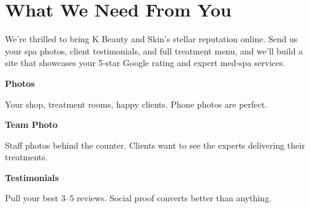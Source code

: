 \documentclass[11pt,letterpaper]{article}
\begin{document}
\vspace{0.2em}

\section*{What We Need From You}

We’re thrilled to bring K Beauty and Skin’s stellar reputation online. Send us your spa photos, client testimonials, and full treatment menu, and we’ll build a site that showcases your 5‑star Google rating and expert med‑spa services.

\vspace{0.12em}

\noindent\begin{minipage}[t]{0.48\textwidth}
\begin{tcolorbox}[colframe=accent-teal, boxrule=1pt, left=0.7em, right=0.7em, top=0.5em, bottom=0.5em, arc=4pt, boxsep=0pt]
{\bfseries\small\color{accent-teal}Photos}

\vspace{0.15em}

{\small Your shop, treatment rooms, happy clients. Phone photos are perfect.}
\end{tcolorbox}

\vspace{0.1em}

\begin{tcolorbox}[colframe=accent-teal, boxrule=1pt, left=0.7em, right=0.7em, top=0.5em, bottom=0.5em, arc=4pt, boxsep=0pt]
{\bfseries\small\color{accent-teal}Team Photo}

\vspace{0.15em}

{\small Staff photos behind the counter. Clients want to see the experts delivering their treatments.}
\end{tcolorbox}

\vspace{0.1em}

\begin{tcolorbox}[colframe=accent-teal, boxrule=1pt, left=0.7em, right=0.7em, top=0.5em, bottom=0.5em, arc=4pt, boxsep=0pt]
{\bfseries\small\color{accent-teal}Testimonials}

\vspace{0.15em}

{\small Pull your best 3--5 reviews. Social proof converts better than anything.}
\end{tcolorbox}
\end{minipage}
\hfill
\end{document}
